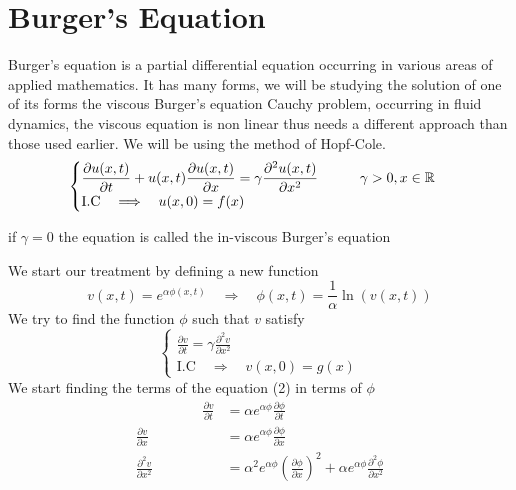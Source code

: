 \documentclass[]{article}
\begin{document}
\section{Burger's Equation}
Burger's equation  is a partial differential equation occurring in various areas of applied mathematics. 
It has many forms, we will be studying the solution of one of its forms
the viscous Burger's equation Cauchy problem, occurring in fluid dynamics, 
the viscous equation is non linear thus needs a different approach than those used earlier. 
We will be using the method of Hopf-Cole.
\begin{equation}
    \begin{cases}
        \displaystyle \frac{\partial u(x,t)}{\partial t} + u(x,t)\frac{\partial u(x,t)}{\partial x} = \gamma \frac{\partial^2 u(x,t)}{\partial x^2} \quad\quad\quad \gamma > 0 , x \in \mathbb{R}
        \\
        \text{I.C} \quad \Longrightarrow \quad u(x,0) = f(x)
    \end{cases}
\end{equation}
\begin{enrichment*}{}
    if $\gamma = 0$ the equation is called the in-viscous Burger's equation
\end{enrichment*}
We start our treatment by defining a new function
\[
v(x,t) = e^{\alpha\phi(x,t)}  \quad \Longrightarrow \quad \phi(x,t) = \frac{1}{\alpha}\ln(v(x,t))
\]
We try to find the function $\phi$ such that $v$ satisfy
\begin{equation}
    \begin{cases}
        \displaystyle \frac{\partial v}{\partial t} = \gamma \frac{\partial^2 v}{\partial x^2}
        \\
        \text{I.C} \quad \Longrightarrow \quad v(x,0) = g(x)
    \end{cases}
\end{equation}
We start finding the terms of the equation (2) in terms of $\phi$
\begin{align*}
\hspace{2cm}
\frac{\partial v}{\partial t} &= \alpha e^{\alpha\phi} \frac{\partial \phi}{\partial t}
\\
\frac{\partial v}{\partial x} &= \alpha e^{\alpha\phi} \frac{\partial \phi}{\partial x} 
\\
\frac{\partial^2 v}{\partial x^2} &= \alpha^2 e^{\alpha \phi} {\left(\frac{\partial \phi}{\partial x}\right)}^2 + \alpha e^{\alpha\phi} \frac{\partial^2 \phi}{\partial x^2}
\end{align*}
\end{document}
